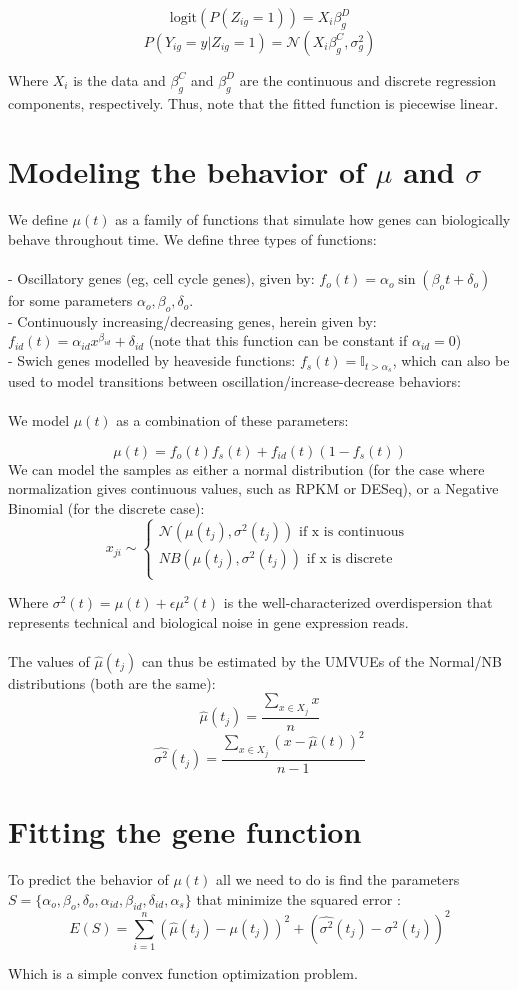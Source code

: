 \documentclass[11pt]{article}
\begin{document}
 $$
 \text{logit} (P(Z_{ig} = 1)) = X_i \beta_{g}^{D}
 $$
 $$
 P(Y_{ig} = y | Z_{ig} = 1) = \mathcal{N} (X_i \beta_{g}^{C}, \sigma^{2}_{g})
 $$
 
 Where $X_i$ is the data and $\beta_g^{C}$ and $\beta_g^{D}$ are the continuous and discrete regression components, respectively. Thus, note that the fitted function is piecewise linear. 

\section{Modeling the behavior of $\mu$ and $\sigma$}
We define $\mu(t)$ as a family of functions that simulate how genes can biologically behave throughout time. We define three types of functions:\\
\\
 - Oscillatory genes (eg, cell cycle genes), given by: $f_{o} (t) = \alpha_{o} \sin (\beta_{o} t + \delta_{o})$ for some parameters $\alpha_{o}, \beta_{o}, \delta_{o}$. \\
 - Continuously increasing/decreasing genes, herein given by: $f_{id} (t) = \alpha_{id} x^{\beta_{id}} + \delta_{id}$ (note that this function can be constant if $\alpha_{id} = 0$)\\
 - Swich genes modelled by heaveside functions: $f_{s} (t) = \mathbb{I}_{t > \alpha_{s}}$, which can also be used to model transitions between oscillation/increase-decrease behaviors: \\
 \\
 We model $\mu(t)$ as a combination of these parameters:
 
 $$
 \mu (t) = f_o (t) f_s (t) + f_{id} (t) (1 - f_s(t))
 $$
We can model the samples as either a normal distribution (for the case where normalization gives continuous values, such as RPKM or DESeq), or a Negative Binomial (for the discrete case):
$$
x_{ji} \sim 
\begin{cases}
\mathcal{N} (\mu(t_j), \sigma^2(t_j)) \text{ if x is continuous } \\
NB (\mu(t_j), \sigma^2(t_j)) \text{ if x is discrete}\\
\end{cases}
$$

Where $\sigma^2 (t) = \mu(t) + \epsilon \mu^2 (t)$ is the well-characterized overdispersion that represents technical and biological noise in gene expression reads.\\
\\
The values of $\hat{\mu}(t_j)$ can thus be estimated by the UMVUEs of the Normal/NB distributions (both are the same):
$$
\hat{\mu} (t_j) = \frac{\mathop{\sum}_{x \in X_j} x}{n}
$$
$$
\hat{\sigma ^2 }(t_j) = \frac{\sum_{x \in X_j} (x - \hat{\mu}(t))^2}{n-1}
$$
\section{Fitting the gene function}
To predict the behavior of $\mu(t)$ all we need to do is find the parameters $S = \{\alpha_{o}, \beta_{o}, \delta_{o}, \alpha_{id}, \beta_{id}, \delta_{id}, \alpha_{s}\}$ that minimize the squared error :
$$
E(S) = \sum_{i = 1}^{n} (\hat{\mu}(t_j) - \mu(t_j))^2 + (\hat{\sigma^2}(t_j) - \sigma^2 (t_j))^2
$$

Which is a simple convex function optimization problem. 
\end{document}
